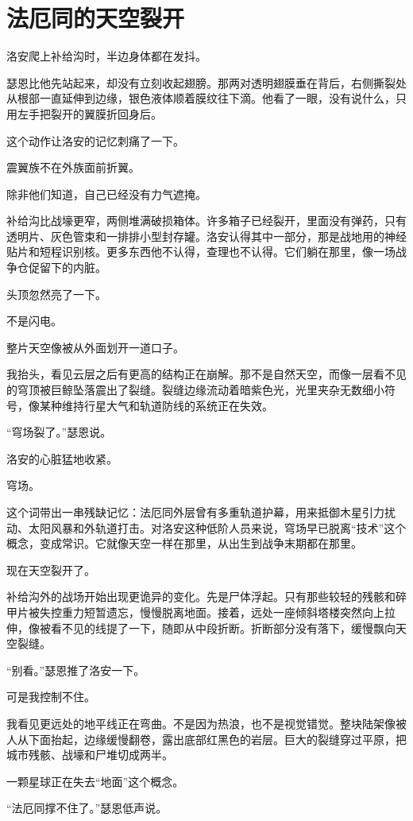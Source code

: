 \chapter{法厄同的天空裂开}

洛安爬上补给沟时，半边身体都在发抖。

瑟恩比他先站起来，却没有立刻收起翅膀。那两对透明翅膜垂在背后，右侧撕裂处从根部一直延伸到边缘，银色液体顺着膜纹往下滴。他看了一眼，没有说什么，只用左手把裂开的翼膜折回身后。

这个动作让洛安的记忆刺痛了一下。

震翼族不在外族面前折翼。

除非他们知道，自己已经没有力气遮掩。

补给沟比战壕更窄，两侧堆满破损箱体。许多箱子已经裂开，里面没有弹药，只有透明片、灰色管束和一排排小型封存罐。洛安认得其中一部分，那是战地用的神经贴片和短程识别核。更多东西他不认得，查理也不认得。它们躺在那里，像一场战争仓促留下的内脏。

头顶忽然亮了一下。

不是闪电。

整片天空像被从外面划开一道口子。

我抬头，看见云层之后有更高的结构正在崩解。那不是自然天空，而像一层看不见的穹顶被巨鲸坠落震出了裂缝。裂缝边缘流动着暗紫色光，光里夹杂无数细小符号，像某种维持行星大气和轨道防线的系统正在失效。

“穹场裂了。”瑟恩说。

洛安的心脏猛地收紧。

穹场。

这个词带出一串残缺记忆：法厄同外层曾有多重轨道护幕，用来抵御木星引力扰动、太阳风暴和外轨道打击。对洛安这种低阶人员来说，穹场早已脱离“技术”这个概念，变成常识。它就像天空一样在那里，从出生到战争末期都在那里。

现在天空裂开了。

补给沟外的战场开始出现更诡异的变化。先是尸体浮起。只有那些较轻的残骸和碎甲片被失控重力短暂遗忘，慢慢脱离地面。接着，远处一座倾斜塔楼突然向上拉伸，像被看不见的线提了一下，随即从中段折断。折断部分没有落下，缓慢飘向天空裂缝。

“别看。”瑟恩推了洛安一下。

可是我控制不住。

我看见更远处的地平线正在弯曲。不是因为热浪，也不是视觉错觉。整块陆架像被人从下面抬起，边缘缓慢翻卷，露出底部红黑色的岩层。巨大的裂缝穿过平原，把城市残骸、战壕和尸堆切成两半。

一颗星球正在失去“地面”这个概念。

“法厄同撑不住了。”瑟恩低声说。

